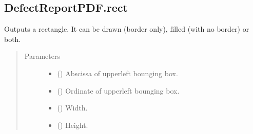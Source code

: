 \documentclass[letterpaper,10pt,english]{sphinxmanual}
\begin{document}
\begin{fulllineitems}
\begin{fulllineitems}
\begin{quote}
\begin{description}
\end{description}\end{quote}

\end{fulllineitems}



\subsection{DefectReportPDF.rect}
\label{\detokenize{generated/quality_assessment.quality_pdf_report.DefectReportPDF.rect:defectreportpdf-rect}}\label{\detokenize{generated/quality_assessment.quality_pdf_report.DefectReportPDF.rect::doc}}

\begin{fulllineitems}
\label{\detokenize{generated/quality_assessment.quality_pdf_report.DefectReportPDF.rect:quality_assessment.quality_pdf_report.DefectReportPDF.rect}}
\sphinxAtStartPar
Outputs a rectangle.
It can be drawn (border only), filled (with no border) or both.
\begin{quote}\begin{description}
\item[{Parameters}] \leavevmode\begin{itemize}
\item {} 
\sphinxAtStartPar
{} () \textendash{} Abscissa of upper\sphinxhyphen{}left bounging box.

\item {} 
\sphinxAtStartPar
{} () \textendash{} Ordinate of upper\sphinxhyphen{}left bounging box.

\item {} 
\sphinxAtStartPar
{} () \textendash{} Width.

\item {} 
\sphinxAtStartPar
{} () \textendash{} Height.


\end{itemize}
\end{description}
\end{quote}
\end{fulllineitems}
\end{fulllineitems}
\end{document}
